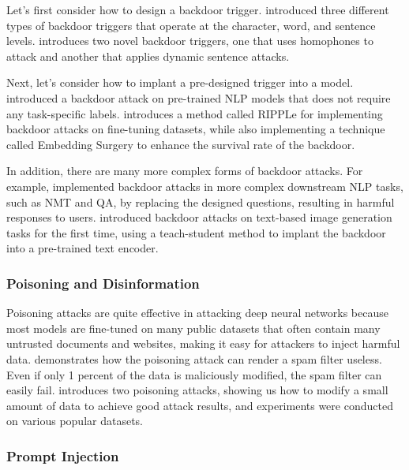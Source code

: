 \documentclass[conference]{IEEEtran}
\begin{document}
\par Let's first consider how to design a backdoor trigger. 
\cite{chen2021badnl} introduced three different types of backdoor triggers 
that operate at the character, word, and sentence levels. 
\cite{struppek2022rickrolling} introduces two novel backdoor triggers, one that uses 
homophones to attack and another that applies dynamic sentence attacks.

\par Next, let's consider how to implant a pre-designed trigger into a model. 
\cite{shen2021backdoor} introduced a backdoor attack on pre-trained NLP models 
that does not require any task-specific labels. \cite{kurita2020weight} introduces a method called 
RIPPLe for implementing backdoor attacks on fine-tuning datasets, while 
also implementing a technique called Embedding Surgery to enhance the survival 
rate of the backdoor.

\par In addition, there are many more complex forms of backdoor attacks. 
For example, \cite{li2021hidden} implemented backdoor attacks in more complex downstream NLP tasks, 
such as NMT and QA, by replacing the designed questions, resulting in harmful responses 
to users. \cite{struppek2022rickrolling} introduced backdoor attacks on text-based image generation tasks for 
the first time, using a teach-student method to implant the backdoor into a pre-trained 
text encoder.

\subsubsection*{Poisoning and Disinformation}

\par Poisoning attacks are quite effective in attacking deep neural networks because most 
models are fine-tuned on many public datasets that often contain many untrusted documents 
and websites, making it easy for attackers to inject harmful data. \cite{nelson2008exploiting} demonstrates 
how the poisoning attack can render a spam filter useless. Even if only 1 percent 
of the data is maliciously modified, the spam filter can easily fail. \cite{carlini2023poisoning} introduces 
two poisoning attacks, showing us how to modify a small amount of data to achieve good 
attack results, and experiments were conducted on various popular datasets.

\subsubsection*{Prompt Injection}
\end{document}
